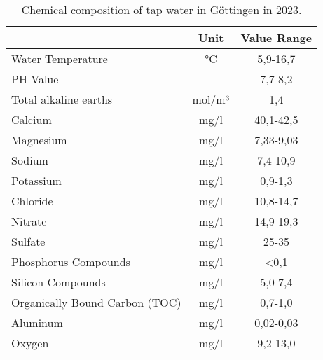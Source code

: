 \begin{table}[H]
    \centering 
    \begin{tabular}{|l|c|c|}
    \hline
                                   & Unit   & \multicolumn{1}{l|}{Value Range} \\ \hline
    Water Temperature              & °C     & 5,9-16,7                                  \\ \hline
    PH Value                       &        & 7,7-8,2                                   \\ \hline
    Total alkaline earths          & mol/m³ & 1,4                                       \\ \hline
    Calcium                        & mg/l   & 40,1-42,5                                 \\ \hline
    Magnesium                      & mg/l   & 7,33-9,03                                 \\ \hline
    Sodium                         & mg/l   & 7,4-10,9                                  \\ \hline
    Potassium                      & mg/l   & 0,9-1,3                                   \\ \hline
    Chloride                       & mg/l   & 10,8-14,7                                 \\ \hline
    Nitrate                        & mg/l   & 14,9-19,3                                 \\ \hline
    Sulfate                        & mg/l   & 25-35                                     \\ \hline
    Phosphorus Compounds           & mg/l   & \textless{}0,1                            \\ \hline
    Silicon Compounds              & mg/l   & 5,0-7,4                                   \\ \hline
    Organically Bound Carbon (TOC) & mg/l   & 0,7-1,0                                   \\ \hline
    Aluminum                       & mg/l   & 0,02-0,03                                 \\ \hline
    Oxygen                         & mg/l   & 9,2-13,0                                  \\ \hline
    \end{tabular}
    \caption{Chemical composition of tap water in Göttingen in 2023.}
        \label{table:water_composition}
    \end{table}

